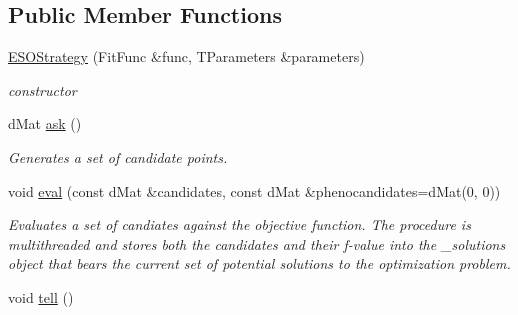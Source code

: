 \subsection*{Public Member Functions}
\begin{DoxyCompactItemize}
\item 
\hyperlink{classlibcmaes_1_1ESOStrategy_a3736c9ce43cf708675229ff7b3ae4166}{E\-S\-O\-Strategy} (Fit\-Func \&func, T\-Parameters \&parameters)
\begin{DoxyCompactList}\small\item\em constructor \end{DoxyCompactList}\item 
d\-Mat \hyperlink{classlibcmaes_1_1ESOStrategy_af614d71ca3e8353b3027723220c9e3b4}{ask} ()
\begin{DoxyCompactList}\small\item\em Generates a set of candidate points. \end{DoxyCompactList}\item 
void \hyperlink{classlibcmaes_1_1ESOStrategy_a5e2e44bd0808efa95feea7ff5ef7eb91}{eval} (const d\-Mat \&candidates, const d\-Mat \&phenocandidates=d\-Mat(0, 0))
\begin{DoxyCompactList}\small\item\em Evaluates a set of candiates against the objective function. The procedure is multithreaded and stores both the candidates and their f-\/value into the \-\_\-solutions object that bears the current set of potential solutions to the optimization problem. \end{DoxyCompactList}\item 
\hypertarget{classlibcmaes_1_1ESOStrategy_ad35926877abdaed3922b316f57723612}{void \hyperlink{classlibcmaes_1_1ESOStrategy_ad35926877abdaed3922b316f57723612}{tell} ()}\label{classlibcmaes_1_1ESOStrategy_ad35926877abdaed3922b316f57723612}


\end{DoxyCompactItemize}
